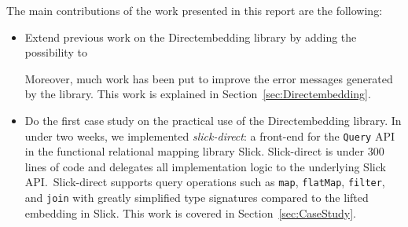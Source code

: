 \documentclass[11pt,a4paper]{article}
\begin{document}
The main contributions of the work presented in this report are the following:
\begin{itemize}
    \item Extend previous work on the Directembedding library by adding the possibility to
        Moreover, much work has been put to improve the error messages generated by the library.
        This work is explained in Section~\ref{sec:Directembedding}.
    \item Do the first case study on the practical use of the Directembedding library.
        In under two weeks, we implemented \emph{slick-direct}: a front-end for the \texttt{Query} API in the functional relational mapping library Slick.
        Slick-direct is under 300 lines of code and delegates all implementation logic to the underlying Slick API.\
        Slick-direct supports query operations such as \texttt{map}, \texttt{flatMap}, \texttt{filter}, and \texttt{join} with greatly simplified type signatures compared to the lifted embedding in Slick.
        This work is covered in Section~\ref{sec:CaseStudy}.
\end{itemize}







\printbibliography{}
\end{document}
